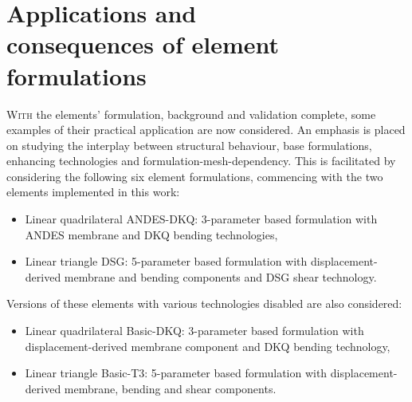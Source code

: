 



\chapter[Applications and consequences of element formulations]{Applications and \\ consequences of element \\ formulations}
\label{chap:chapter_application}

\renewcommand{\Thema}{Applications and consequences of element technologies}

\lettrine[lines=2]{W}{ith} the elements' formulation, background and validation complete, some examples of their practical application are now considered. An emphasis is placed on studying the interplay between structural behaviour, base formulations, enhancing technologies and formulation-mesh-dependency. This is facilitated by considering the following six element formulations, commencing with the two elements implemented in this work:
\begin{itemize}
	\item Linear quadrilateral ANDES-DKQ: 3-parameter based formulation with ANDES membrane and DKQ bending technologies,
	\item Linear triangle DSG: 5-parameter based formulation with displacement-derived membrane and bending components and DSG shear technology.
\end{itemize}

Versions of these elements with various technologies disabled are also considered:
\begin{itemize}
	\item Linear quadrilateral Basic-DKQ: 3-parameter based formulation with displacement-derived membrane component and DKQ bending technology,
	\item Linear triangle Basic-T3: 5-parameter based formulation with displacement-derived membrane, bending and shear components.
\end{itemize}
	
